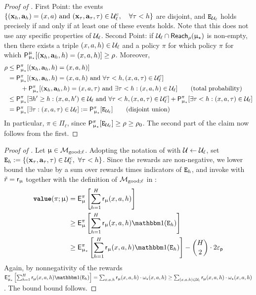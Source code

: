 	\begin{proof}[Proof of ] First Point: the events $\{(\mathbf{x}_h,\mathbf{a}_{h}) = (x,a) \text{ and } (\mathbf{x}_\tau,\mathbf{a}_{\tau},\tau)\in \mathcal{U}_{\ell}^c, \quad \forall \tau < h\}$ are disjoint, and $\texttt{E}_{\mathcal{U}_{\ell}}$ holds precisely if and only if at least one of these events holds. Note that this  does not use any specific properties of $\mathcal{U}_{\ell}$. Second Point: if $\mathcal{U}_{\ell} \cap \mathsf{Reach}_{\rho}(\upmu_{\star})$ is non-empty, then there exists a triple $(x,a,h) \in \mathcal{U}_{\ell}$ and a policy $\pi$ for which policy $\pi$ for which $\mathsf{P}_{\upmu_{\star}}^{\upmu}[(\mathbf{x}_h, \mathbf{a}_h,h) = (x,a,h)] \ge \rho$. Moreover,
\begin{align*}
\rho &\le \mathsf{P}_{\upmu_{\star}}^{\pi}[(\mathbf{x}_h, \mathbf{a}_h,h) = (x,a,h)] \\
&= \mathsf{P}_{\upmu_{\star}}^{\pi}[(\mathbf{x}_h, \mathbf{a}_h,h) = (x,a,h) \text{ and } \forall \tau < h, (x,a,\tau) \in \mathcal{U}_{\ell}^c]  \\
&\qquad+ \mathsf{P}_{\upmu_{\star}}^{\pi}[(\mathbf{x}_h, \mathbf{a}_h,h) = (x,a,\tau) \text{ and } \exists \tau < h :  (x,a,h) \in \mathcal{U}_{\ell}] \tag*{(total probability)}\\
&\le \mathsf{P}_{\upmu_{\star}}^{\pi}[\exists h' \ge h: (x,a,h')\in \mathcal{U}_{\ell} \text{ and } \forall \tau < h, (x,a,\tau) \in \mathcal{U}_{\ell}^c]  + \mathsf{P}_{\upmu_{\star}}^{\pi}[\exists \tau < h :  (x,a,\tau) \in \mathcal{U}_{\ell}]\\
&= \mathsf{P}_{\upmu_{\star}}^{\pi}[\exists \tau  :  (x,a,\tau) \in \mathcal{U}_{\ell}] := \mathsf{P}_{\upmu_{\star}}^{\pi}[\texttt{E}_{\mathcal{U}_{\ell}}]\tag*{(disjoint union)}
\end{align*}
In particular, $\pi \in \Pi_{\ell}$, since $\mathsf{P}_{\upmu_{\star}}^{\pi}[\texttt{E}_{\mathcal{U}_{\ell}}] \ge \rho \ge \rho_0$. The second part of the claim now follows from the first.
\end{proof}

	\begin{proof}[Proof of ]

		Let $\upmu \in \mathcal{M}_{\mathrm{good};\ell}$. Adopting the notation of  with $\mathcal{U} \gets \mathcal{U}_\ell$, set $\texttt{E}_h := \{(\mathbf{x}_\tau,\mathbf{a}_{\tau},\tau) \in \mathcal{U}_\ell^c,~ \forall \tau < h\}$. Since the rewards are non-negative, we lower bound the value by a sum over rewards times indicators of $\texttt{E}_h$, and invoke  with $\tilde{r} = \mathsf{r}_{\upmu}$ together with the definition of $\mathcal{M}_{\mathrm{good};\ell}$ in :
		\begin{align*}
		\valuef{\pi}{\model} &= \sfE^{\pi}_{\model}\left[\sum_{h=1}^H \sfr_{\model}\xah \right]\\
		&\ge \sfE^{\pi}_{\model}\left[\sum_{h=1}^H \sfr_{\model}\xah \ind(\scrE_h)\right]\\
		&\ge  \sfE^{\pi}_{\modst}\left[\sum_{h=1}^H \sfr_{\model}\xah \ind(\scrE_h)\right] - \binom{H}{2}\cdot 2\epsp
		\end{align*}
		Again, by nonnegativity of the rewards $\sfE^{\pi}_{\modst}\left[\sum_{h=1}^H \sfr_{\model}\xah \ind(\scrE_h)\right] = \sum_{x,a,h} \sfr_{\model}\xah \cdot \omegast\xah \ge \sum_{(x,a,h) \in \calU_{\ell}} \sfr_{\model}\xah \cdot \omegast\xah$. The bound bound follows.
	\end{proof}

